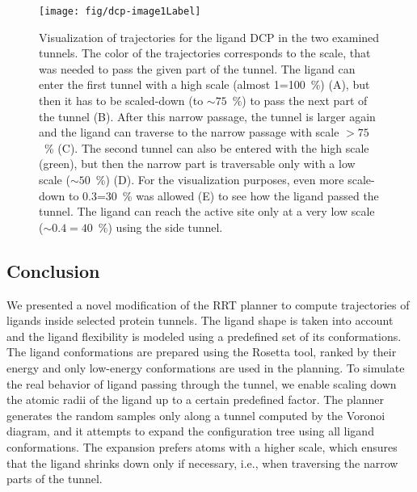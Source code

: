 \documentclass{bmcart}
\begin{document}
\begin{figure}
\centering
\vskip -5pt
\texttt{[image: fig/dcp-image1Label]}\\
\vspace{-5pt}
\caption{\label{fig::dcp}
    \small
Visualization of trajectories for the ligand DCP in the two examined tunnels.  
The color of the trajectories corresponds to the scale, that was needed to pass the given part of the tunnel.
The ligand can enter the first tunnel with a high scale (almost 1=100~\%) (A), but then it has to be scaled-down (to $\sim75$~\%) to pass the
next part of the tunnel (B). After this narrow passage, the tunnel is larger again and the ligand can traverse to the narrow passage with
scale $>75$~\% (C).
The second tunnel can also be entered with the high scale (green), but then the narrow part is traversable only with a low scale ($\sim50$~\%) (D). 
For the visualization purposes, even more scale-down to 0.3=30~\% was allowed (E) to see how the ligand passed the tunnel.
The ligand can reach the active site only at a very low scale ($\sim0.4=40$~\%) using the side tunnel.
}
\end{figure}

\subsection*{Conclusion}
We presented a novel modification of the RRT planner to compute trajectories of ligands inside selected protein tunnels.
The ligand shape is taken into account and the ligand flexibility is modeled using a predefined set of its conformations.
The ligand conformations are prepared using the Rosetta tool, ranked by their energy and only low-energy conformations are used in the planning.
To simulate the real behavior of ligand passing through the tunnel, we enable scaling down the atomic radii of the ligand up to a certain predefined factor.
The planner generates the random samples only along a tunnel computed by the Voronoi diagram, and it attempts to expand the configuration
tree using all ligand conformations. 
The expansion prefers atoms with a higher scale, which ensures that the ligand shrinks down only if necessary, i.e., when traversing the narrow parts of the tunnel.

\end{document}

